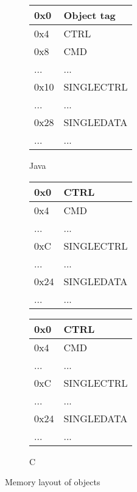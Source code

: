 \begin{figure}[H]

  \centering
  \begin{subfigure}{0.31\textwidth}
    \begin{tabular}{|l|l|}
      \hline
      0x0&Object tag \\ \hline
      0x4&CTRL       \\ \hline
      0x8&CMD        \\ \hline
      ...&...        \\ \hline
      0x10&SINGLECTRL\\ \hline
      ...&...        \\ \hline
      0x28&SINGLEDATA\\ \hline
      ...&...        \\ \hline
    \end{tabular}
    \caption{Java}
    \label{fig:back:memlayout:java}
  \end{subfigure}
  \hfill
  \begin{subfigure}{0.31\textwidth}
    \begin{tabular}{|l|l|}
      \hline
      0x0&CTRL       \\ \hline
      0x4&CMD        \\ \hline
      ...&...        \\ \hline
      0xC&SINGLECTRL \\ \hline
      ...&...        \\ \hline
      0x24&SINGLEDATA\\ \hline
      ...&...        \\ \hline
    \end{tabular}
    \caption{\rust}
    \label{fig:back:memlayout:rust}
  \end{subfigure}
  \hfill
  \begin{subfigure}{0.31\textwidth}
    \begin{tabular}{|l|l|}
      \hline
      0x0&CTRL       \\ \hline
      0x4&CMD        \\ \hline
      ...&...        \\ \hline
      0xC&SINGLECTRL \\ \hline
      ...&...        \\ \hline
      0x24&SINGLEDATA\\ \hline
      ...&...        \\ \hline
    \end{tabular}
        \caption{C}
    \label{fig:back:memlayout:c}
  \end{subfigure}
  \caption{Memory layout of objects}
  \label{fig:back:memlayout}

\end{figure}

